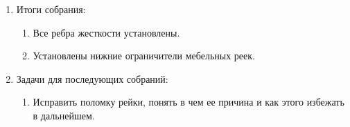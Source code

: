 \begin{enumerate}
\begin{enumerate}
    \end{enumerate}
    
	\item Итоги собрания: \newline
	\begin{enumerate}
	  \item Все ребра жесткости установлены.\newline
	  
      \item Установлены нижние ограничители мебельных реек.\newline
      
    \end{enumerate}
    
	\item Задачи для последующих собраний:\newline
	\begin{enumerate}
	  \item Исправить поломку рейки, понять в чем ее причина и как этого избежать в дальнейшем.\newline
	  
    \end{enumerate}     
\end{enumerate}

\fillpage
